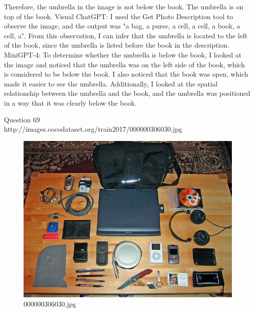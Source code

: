 \begin{enumerate}
    Therefore, the umbrella in the image is not below the book. The umbrella is on top of the book.
    \subitem Visual ChatGPT: I used the Get Photo Description tool to observe the image, and the output was "a bag, a purse, a cell, a cell, a book, a cell, a". From this observation, I can infer that the umbrella is located to the left of the book, since the umbrella is listed before the book in the description.
    \subitem MiniGPT-4: To determine whether the umbrella is below the book, I looked at the image and noticed that the umbrella was on the left side of the book, which is considered to be below the book. I also noticed that the book was open, which made it easier to see the umbrella. Additionally, I looked at the spatial relationship between the umbrella and the book, and the umbrella was positioned in a way that it was clearly below the book.
\end{enumerate}
Question 69\\
http://images.cocodataset.org/train2017/000000306030.jpg
\begin{figure}[h]
    \centering
    \includegraphics[width=0.8\linewidth]{../image set/hard/000000306030.jpg}
    \caption{000000306030.jpg}
\end{figure}
